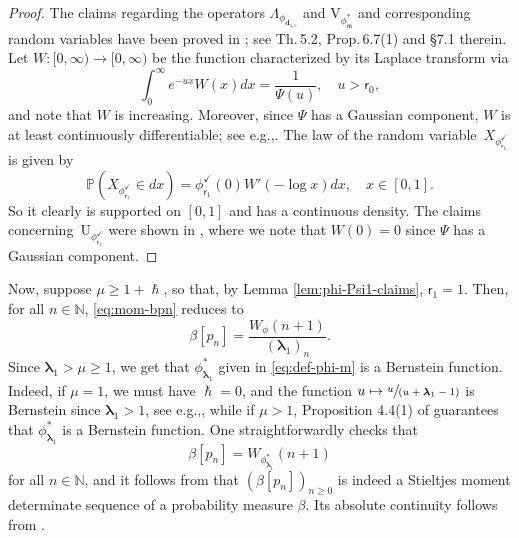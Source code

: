 \documentclass[11pt]{article}
\newcommand{\eg}{e.g.,\xspace}
\numberwithin{equation}{section}
\let\epsilon\varepsilon
\newcommand\mto{\mathchoice{\longmapsto}{\mapsto}{\mapsto}{\mapsto}}
\newcommand{\spfrac}[2]{\sfrac{#1}{(#2)}}
\theoremstyle{plain}
\theoremstyle{definition}
\newcommand{\N}{\mathbb{N}}
\newcommand{\Prob}{\mathbb{P}}
\newcommand{\m}{\mathfrak{m}}
\newcommand{\dz}{{\bm{d}}_{1,\epsilon}}
\newcommand{\lam}{{\bm{\lambda}_1}}
\newcommand{\tet}{{\mathsf{r}_0}}
\newcommand{\vat}{{\mathsf{r}_1}}
\newcommand{\phm}{{\phi_\m^*}}
\renewcommand{\varphi}{{\phi_{\vat}^{\checkmark}}}
\let\h\hslash
\let\mo\mu
\let\bpsi\beta
\begin{document}
\begin{proof}
The claims regarding the operators $\Lambda_{\phi_{\dz}}$ and $\mathrm{V}_{\phm}$ and corresponding random variables have been proved in \cite{Patie-Savov-GeL}; see Th.\,5.2, Prop.\,6.7(1) and \S 7.1 therein. Let $W \colon [0,\infty) \to [0,\infty)$ be the function characterized by its Laplace transform via
\begin{equation*}
\int_{0}^{\infty}e^{-u x}W(x)dx = \frac{1}{\Psi(u)}, \quad u > \tet,
\end{equation*}
and note that $W$ is increasing. Moreover, since $\Psi$ has a Gaussian component, $W$ is at least continuously differentiable; see \eg \cite[\S 8.2]{Kyprianou2014}. The law of the random variable~$X_\varphi$ is given by
\begin{equation*}
\Prob(X_\varphi \in dx) = \varphi(0)W'(-\log x)dx, \quad x \in [0,1].
\end{equation*}
So it clearly is supported on $[0,1]$ and has a continuous density. The claims concerning~$\mathrm{U}_{\varphi}$ were shown in \cite[Lem.\,4.2]{Intertwining-Krein}, where we note that $W(0)=0$ since $\Psi$ has a Gaussian component.
\end{proof}

Now, suppose $\mo \geq 1+\h$, so that, by Lemma \ref{lem:phi-Psi1-claims}, $\vat= 1$. Then, for all $n\in\N$, \eqref{eq:mom-bpn} reduces to
\begin{equation*}
\bpsi[p_n] = \frac{W_{\phi}(n+1)}{(\lam)_n}.
\end{equation*}
Since $\lam > \mo \geq 1$, we get that $\phi_{\lam}^*$ given in \eqref{eq:def-phi-m} is a Bernstein function. Indeed, if $\mo = 1$, we must have $\h = 0$, and the function $u \mto \spfrac{u}{u+\lam-1}$ is Bernstein since $\lam > 1$, see \eg \cite[Chap.\,16]{SchillingSongVondracek10}, while if $\mo > 1$, Proposition 4.4(1) of \cite{SchillingSongVondracek10}
guarantees that $\phi_{\lam}^*$ is a Bernstein function. One straightforwardly checks that
\begin{equation*}
\bpsi[p_n] = W_{\phi_{\lam}^*}(n+1)
\end{equation*}
for all $n\in \mathbb{N}$, and it follows from \cite{Berg} that $(\bpsi [p_n])_{n\geq 0}$ is indeed a Stieltjes moment determinate sequence of a probability measure $\bpsi$. Its absolute continuity follows from \cite[Prop.\,2.4]{Patie-11-Factorization_e}.
\end{document}
